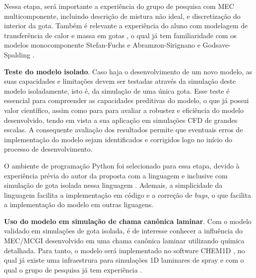 Nessa etapa, será importante a experiência do grupo de pesquisa com MEC multicomponente, incluindo descrição de mistura não ideal, e discretização do interior da gota.
Também é relevante a experiência do aluno com modelagem de transferência de calor e massa em gotas , o qual já tem familiaridade com os modelos monocomponente Stefan-Fuchs \cite{Glassman2008} e Abramzon-Sirignano \cite{Sirignano1989} e Godsave-Spalding \cite{Law1978}.

\textbf{Teste do modelo isolado}.
Caso haja o desenvolvimento de um novo modelo, as suas capacidades e limitações devem ser testadas através da simulação deste modelo isoladamente, isto é, da simulação de uma única gota.
Esse teste é essencial para compreender as capacidades preditivas do modelo, o que já possui valor científico, assim como para 
para avaliar a robustez e eficiência do modelo desenvolvido, tendo em vista a sua aplicação em simulações CFD de grandes escalas.
A consequente avaliação dos resultados permite que eventuais erros de implementação do modelo sejam identificados e corrigidos logo no início do processo de desenvolvimento.

O ambiente de programação Python foi selecionado para essa etapa, devido à experiência prévia do autor da proposta com a linguagem e inclusive com simulação de gota isolada nessa linguagem \cite{HenningsJ2024MT}.
Ademais, a simplicidade da linguagem facilita a implementação em código e a correção de \emph{bugs}, o que facilita a implementação do modelo em outras liguagens.

\textbf{Uso do modelo em simulação de chama canônica laminar}.
Com o modelo validado em simulações de gota isolada, é de interesse conhecer a influência do MEC/MCGI desenvolvido em uma chama canônica laminar utilizando química detalhada.
Para tanto, o modelo será implementado no software CHEM1D \cite{Sommers1994PhD}, no qual já existe uma infraestrura para simulações 1D laminares de spray \cite{Sommers1994PhD,vanOijen2002CTM,vanOijen2016PECS, SacomanoF2018CTM,SacomanoF2021Fluids} e com o qual o grupo de pesquisa já tem experiência \cite{SacomanoF2018CTM,SacomanoF2019IJHMT,SacomanoF2021Fluids,SacomanoF2024CF,SacomanoF2025CF}.

